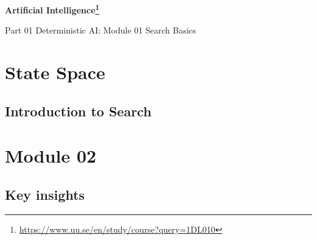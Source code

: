 \documentclass[./main.tex]{subfiles}
\begin{document}
\pagecolor{PageColor}
\color{FontColor}

{\LARGE\bf Artificial Intelligence\footnote{\url{https://www.uu.se/en/study/course?query=1DL010}}}

\vspace{12pt}

{\Large Part 01 Deterministic AI: Module 01 Search Basics}

\vspace{12pt}

\section{State Space}

\subsection{Introduction to Search}

\newpage

\section{Module 02}

\subsection{Key insights}
\end{document}
